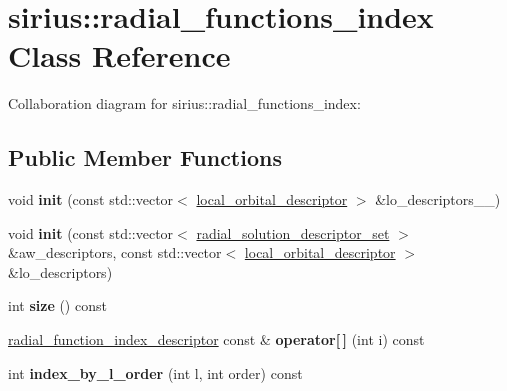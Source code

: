 \hypertarget{classsirius_1_1radial__functions__index}{}\section{sirius\+:\+:radial\+\_\+functions\+\_\+index Class Reference}
\label{classsirius_1_1radial__functions__index}


Collaboration diagram for sirius\+:\+:radial\+\_\+functions\+\_\+index\+:
\subsection*{Public Member Functions}
\begin{DoxyCompactItemize}
\item 
\hypertarget{classsirius_1_1radial__functions__index_a6bbe2c3e14c0a9f1d003f2dd862f36d8}{}void {\bfseries init} (const std\+::vector$<$ \hyperlink{structlocal__orbital__descriptor}{local\+\_\+orbital\+\_\+descriptor} $>$ \&lo\+\_\+descriptors\+\_\+\+\_\+)\label{classsirius_1_1radial__functions__index_a6bbe2c3e14c0a9f1d003f2dd862f36d8}

\item 
\hypertarget{classsirius_1_1radial__functions__index_a0877ed27ff174b3b713a5a5ddaf6cb45}{}void {\bfseries init} (const std\+::vector$<$ \hyperlink{descriptors_8h_aec4b6e691d842d5c6b06552800a478b3}{radial\+\_\+solution\+\_\+descriptor\+\_\+set} $>$ \&aw\+\_\+descriptors, const std\+::vector$<$ \hyperlink{structlocal__orbital__descriptor}{local\+\_\+orbital\+\_\+descriptor} $>$ \&lo\+\_\+descriptors)\label{classsirius_1_1radial__functions__index_a0877ed27ff174b3b713a5a5ddaf6cb45}

\item 
\hypertarget{classsirius_1_1radial__functions__index_ae3ab1606e3a7886c69612d78e4437f6a}{}int {\bfseries size} () const \label{classsirius_1_1radial__functions__index_ae3ab1606e3a7886c69612d78e4437f6a}

\item 
\hypertarget{classsirius_1_1radial__functions__index_a6115cf5367e61d1de59eaf364caf3ab5}{}\hyperlink{structradial__function__index__descriptor}{radial\+\_\+function\+\_\+index\+\_\+descriptor} const \& {\bfseries operator\mbox{[}$\,$\mbox{]}} (int i) const \label{classsirius_1_1radial__functions__index_a6115cf5367e61d1de59eaf364caf3ab5}

\item 
\hypertarget{classsirius_1_1radial__functions__index_aa50b18b98b1132342a70ee7839e7a7a7}{}int {\bfseries index\+\_\+by\+\_\+l\+\_\+order} (int l, int order) const \label{classsirius_1_1radial__functions__index_aa50b18b98b1132342a70ee7839e7a7a7}


\end{DoxyCompactItemize}
